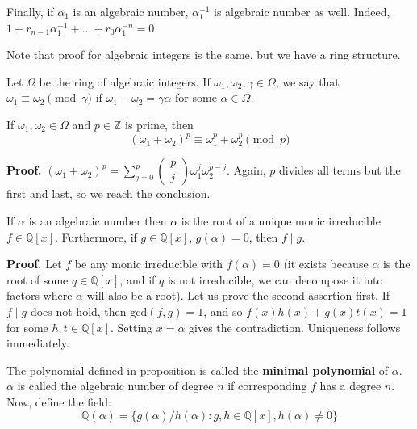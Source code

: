\documentclass{template}
\begin{document}
Finally, if $\alpha_1$ is an algebraic number, $\alpha_1^{-1}$ is algebraic
number as well. Indeed, $1+r_{n-1}\alpha_1^{-1} + \dots + r_0\alpha_1^{-n} = 0$. 

Note that proof for algebraic integers is the same, but we have a ring
structure.

Let $\Omega$ be the ring of algebraic integers. If $\omega_1,\omega_2,\gamma \in
\Omega$, we say that $\omega_1 \equiv \omega_2 \pmod{\gamma}$ if
$\omega_1-\omega_2 = \gamma\alpha$ for some $\alpha \in \Omega$. 

\begin{proposition}
    If $\omega_1,\omega_2 \in \Omega$ and $p \in \mathbb{Z}$ is prime, then
    \begin{equation*}
        (\omega_1 + \omega_2)^p \equiv \omega_1^p + \omega_2^p \pmod{p}
    \end{equation*}
\end{proposition}

\textbf{Proof.} $(\omega_1+\omega_2)^p = \sum_{j=0}^p \begin{pmatrix} p \\ j
\end{pmatrix} \omega_1^j\omega_2^{p-j}$. Again, $p$ divides all terms but
the first and last, so we reach the conclusion.

\begin{proposition}
    If $\alpha$ is an algebraic number then $\alpha$ is the root of a unique 
    monic irreducible $f \in \mathbb{Q}[x]$. Furthermore, if $g \in \mathbb{Q}[x]$,
    $g(\alpha)=0$, then $f \mid g$.
\end{proposition}

\textbf{Proof.} Let $f$ be any monic irreducible with $f(\alpha)=0$ (it exists
because $\alpha$ is the root of some $q \in \mathbb{Q}[x]$, and if $q$ is not
irreducible, we can decompose it into factors where $\alpha$ will also be a
root). Let us prove the second assertion first. If $f \mid g$ does not hold,
then $\text{gcd}(f,g) = 1$, and so $f(x)h(x) + g(x)t(x) = 1$ for some $h,t \in
\mathbb{Q}[x]$. Setting $x=\alpha$ gives the contradiction. Uniqueness follows 
immediately.

The polynomial defined in proposition is called the \textbf{minimal polynomial}
of $\alpha$. $\alpha$ is called the algebraic number of degree $n$ if 
corresponding $f$ has a degree $n$. Now, define the field:
\begin{equation*}
    \mathbb{Q}(\alpha) = \{g(\alpha)/h(\alpha): g, h \in \mathbb{Q}[x], h(\alpha) \neq 0\}
\end{equation*}
\end{document}
